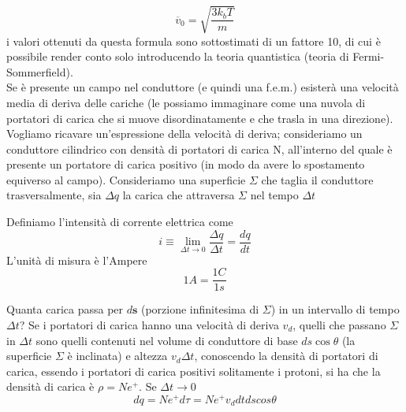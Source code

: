 \documentclass[
10pt, %
a4paper, %
oneside, %
headinclude,footinclude, %
BCOR5mm, %
]{scrartcl}
\begin{document}
\[\overline{v}_0=\sqrt{\frac{3k_b T}{m}}\]
i valori ottenuti da questa formula sono sottostimati di un fattore 10, di cui è possibile render conto solo introducendo la teoria quantistica (teoria di Fermi-Sommerfield).\\
Se è presente un campo nel conduttore (e quindi una f.e.m.) esisterà una velocità media di deriva delle cariche (le possiamo immaginare come una nuvola di portatori di carica che si muove disordinatamente e che trasla in una direzione). Vogliamo ricavare un'espressione della velocità di deriva; consideriamo un conduttore cilindrico con densità di portatori di carica N, all'interno del quale è presente un portatore di carica positivo (in modo da avere lo spostamento equiverso al campo). Consideriamo una superficie \(\Sigma\) che taglia il conduttore trasversalmente, sia $\Delta q$ la carica che attraversa $\Sigma$ nel tempo $\Delta t$
\begin{definizione}
	Definiamo l'intensità di corrente elettrica come
	\[i \equiv \lim_{\Delta t \to 0} \frac{\Delta q}{\Delta t}=\frac{dq}{dt}\]
	L'unità di misura è l'Ampere
	\[1 A = \frac{1 C}{1 s}\]
\end{definizione}
Quanta carica passa per \(d\mathbf{s}\) (porzione infinitesima di $\Sigma$) in un intervallo di tempo $\Delta t$? Se i portatori di carica hanno una velocità di deriva \(v_d\), quelli che passano $\Sigma$ in $\Delta t$ sono quelli contenuti nel volume di conduttore di base \(ds\cos\theta\) (la superficie $\Sigma$ è inclinata) e altezza $v_d\Delta t$, conoscendo la densità di portatori di carica, essendo i portatori di carica positivi solitamente i protoni, si ha che la densità di carica è \(\rho = N e^+\). Se $\Delta t \to 0$
\[dq = N e^+ d\tau = N e^+ v_d dt ds cos\theta\]
\end{document}
